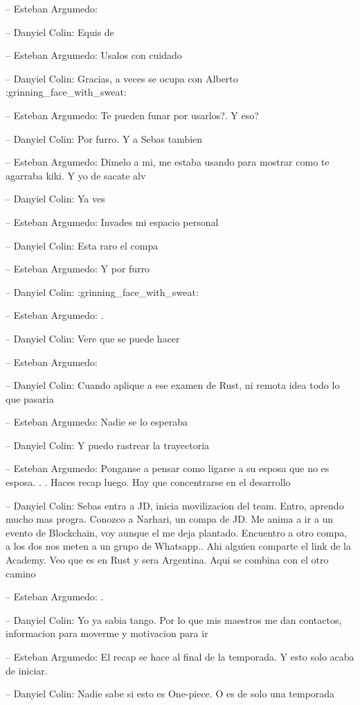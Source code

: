 -- Esteban Argumedo:

-- Danyiel Colin: Equis de

-- Esteban Argumedo: Usalos con cuidado

-- Danyiel Colin: Gracias, a veces se ocupa con Alberto
:grinning\_face\_with\_sweat:

-- Esteban Argumedo: Te pueden funar por usarlos?. Y eso?

-- Danyiel Colin: Por furro. Y a Sebas tambien

-- Esteban Argumedo: Dimelo a mi, me estaba usando para mostrar como te
agarraba kiki. Y yo de sacate alv

-- Danyiel Colin: Ya ves

-- Esteban Argumedo: Invades mi espacio personal

-- Danyiel Colin: Esta raro el compa

-- Esteban Argumedo: Y por furro

-- Danyiel Colin: :grinning\_face\_with\_sweat:

-- Esteban Argumedo: .

-- Danyiel Colin: Vere que se puede hacer

-- Esteban Argumedo:

-- Danyiel Colin: Cuando aplique a ese examen de Rust, ni remota idea
todo lo que pasaria

-- Esteban Argumedo: Nadie se lo esperaba

-- Danyiel Colin: Y puedo rastrear la trayectoria

-- Esteban Argumedo: Ponganse a pensar como ligarse a su esposa que no
es esposa. . . Haces recap luego. Hay que concentrarse en el desarrollo

-- Danyiel Colin: Sebas entra a JD, inicia movilizacion del team. Entro,
aprendo mucho mas progra. Conozco a Narhari, un compa de JD. Me anima a
ir a un evento de Blockchain, voy aunque el me deja plantado. Encuentro
a otro compa, a los dos nos meten a un grupo de Whatsapp.. Ahi alguien
comparte el link de la Academy. Veo que es en Rust y sera Argentina.
Aqui se combina con el otro camino

-- Esteban Argumedo: .

-- Danyiel Colin: Yo ya sabia tango. Por lo que mis maestros me dan
contactos, informacion para moverme y motivacion para ir

-- Esteban Argumedo: El recap se hace al final de la temporada. Y esto
solo acaba de iniciar.

-- Danyiel Colin: Nadie sabe si esto es One-piece. O es de solo una
temporada

